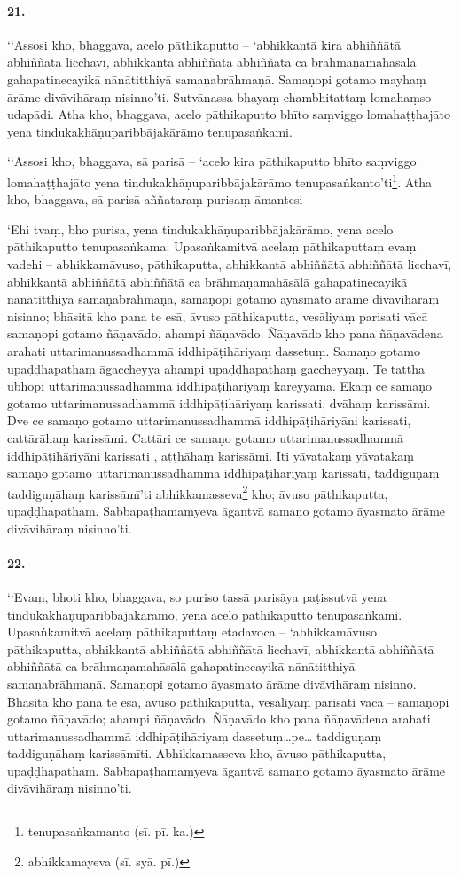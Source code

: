 \paragraph{21.} ‘‘Assosi kho, bhaggava, acelo pāthikaputto – ‘abhikkantā kira abhiññātā abhiññātā licchavī, abhikkantā abhiññātā abhiññātā ca brāhmaṇamahāsālā gahapatinecayikā nānātitthiyā samaṇabrāhmaṇā. Samaṇopi gotamo mayhaṃ ārāme divāvihāraṃ nisinno’ti. Sutvānassa bhayaṃ chambhitattaṃ lomahaṃso udapādi. Atha kho, bhaggava, acelo pāthikaputto bhīto saṃviggo lomahaṭṭhajāto yena tindukakhāṇuparibbājakārāmo tenupasaṅkami.

‘‘Assosi kho, bhaggava, sā parisā – ‘acelo kira pāthikaputto bhīto saṃviggo lomahaṭṭhajāto yena tindukakhāṇuparibbājakārāmo tenupasaṅkanto’ti\footnote{tenupasaṅkamanto (sī. pī. ka.)}. Atha kho, bhaggava, sā parisā aññataraṃ purisaṃ āmantesi –

‘Ehi tvaṃ, bho purisa, yena tindukakhāṇuparibbājakārāmo, yena acelo pāthikaputto tenupasaṅkama. Upasaṅkamitvā acelaṃ pāthikaputtaṃ evaṃ vadehi – abhikkamāvuso, pāthikaputta, abhikkantā abhiññātā abhiññātā licchavī, abhikkantā abhiññātā abhiññātā ca brāhmaṇamahāsālā gahapatinecayikā nānātitthiyā samaṇabrāhmaṇā, samaṇopi gotamo āyasmato ārāme divāvihāraṃ nisinno; bhāsitā kho pana te esā, āvuso pāthikaputta, vesāliyaṃ parisati vācā samaṇopi gotamo ñāṇavādo, ahampi ñāṇavādo. Ñāṇavādo kho pana ñāṇavādena arahati uttarimanussadhammā iddhipāṭihāriyaṃ dassetuṃ. Samaṇo gotamo upaḍḍhapathaṃ āgaccheyya ahampi upaḍḍhapathaṃ gaccheyyaṃ. Te tattha ubhopi uttarimanussadhammā iddhipāṭihāriyaṃ kareyyāma. Ekaṃ ce samaṇo gotamo uttarimanussadhammā iddhipāṭihāriyaṃ karissati, dvāhaṃ karissāmi. Dve ce samaṇo gotamo uttarimanussadhammā iddhipāṭihāriyāni karissati, cattārāhaṃ karissāmi. Cattāri ce samaṇo gotamo uttarimanussadhammā iddhipāṭihāriyāni karissati , aṭṭhāhaṃ karissāmi. Iti yāvatakaṃ yāvatakaṃ samaṇo gotamo uttarimanussadhammā iddhipāṭihāriyaṃ karissati, taddiguṇaṃ taddiguṇāhaṃ karissāmī’ti abhikkamasseva\footnote{abhikkamayeva (sī. syā. pī.)} kho; āvuso pāthikaputta, upaḍḍhapathaṃ. Sabbapaṭhamaṃyeva āgantvā samaṇo gotamo āyasmato ārāme divāvihāraṃ nisinno’ti.

\paragraph{22.} ‘‘Evaṃ, bhoti kho, bhaggava, so puriso tassā parisāya paṭissutvā yena tindukakhāṇuparibbājakārāmo, yena acelo pāthikaputto tenupasaṅkami. Upasaṅkamitvā acelaṃ pāthikaputtaṃ etadavoca – ‘abhikkamāvuso pāthikaputta, abhikkantā abhiññātā abhiññātā licchavī, abhikkantā abhiññātā abhiññātā ca brāhmaṇamahāsālā gahapatinecayikā nānātitthiyā samaṇabrāhmaṇā. Samaṇopi gotamo āyasmato ārāme divāvihāraṃ nisinno. Bhāsitā kho pana te esā, āvuso pāthikaputta, vesāliyaṃ parisati vācā – samaṇopi gotamo ñāṇavādo; ahampi ñāṇavādo. Ñāṇavādo kho pana ñāṇavādena arahati uttarimanussadhammā iddhipāṭihāriyaṃ dassetuṃ…pe… taddiguṇaṃ taddiguṇāhaṃ karissāmīti. Abhikkamasseva kho, āvuso pāthikaputta, upaḍḍhapathaṃ. Sabbapaṭhamaṃyeva āgantvā samaṇo gotamo āyasmato ārāme divāvihāraṃ nisinno’ti.

